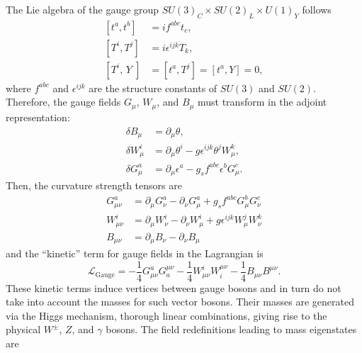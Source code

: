The Lie algebra of the gauge group $S U(3)_C \times S U(2)_{L} \times U(1)_{Y}$ follows
\begin{equation}
\begin{aligned}
	{\left[t^{a}, t^{b}\right] } &=i f^{a b c} t_{c}, \\
	{\left[T^{i}, T^{j}\right] } &=i \epsilon^{i j k} T_{k}, \\
	{\left[T^{i}, \, Y\;\right] } &=\left[t^{a}, T^{j}\right]=\left[t^{a}, Y\right]=0,
\end{aligned}
\end{equation}
where $f^{a b c}$ and $\epsilon^{i j k}$ are the structure constants of $SU(3)$ and $SU(2)$. Therefore, the gauge fields $G_\mu$, $W_\mu$, and $B_\mu$ must transform in the adjoint representation: 
\begin{equation}
	\begin{aligned}
		\delta B_{\mu} &=\partial_{\mu} \theta, \\
		\delta W_{\mu}^{i} &=\partial_{\mu} \theta^{i}-g \epsilon^{i j k} \theta^{j} W_{\mu}^{k}, \\
		\delta G_{\mu}^{a} &=\partial_{\mu} \epsilon^{a}-g_{s} f^{a b c} \epsilon^{b} G_{\mu}^{c}.
	\end{aligned}
\end{equation}
Then, the curvature strength tensors are
\begin{equation}\label{eq:field-strength-tensors}
\begin{aligned}
	G_{\mu \nu}^{a} &=\partial_{\mu} G_{\nu}^{a}-\partial_{\nu} G_{\mu}^{a}+g_{s} f^{a b c} G_{\mu}^{b} G_{\nu}^{c} \\
	W_{\mu \nu}^{i} &=\partial_{\mu} W_{\nu}^{i}-\partial_{\nu} W_{\mu}^{i}+g \epsilon^{i j k} W_{\mu}^{j} W_{\nu}^{k} \\
	B_{\mu \nu} &=\partial_{\mu} B_{\nu}-\partial_{\nu} B_{\mu}
\end{aligned}
\end{equation}
and the ``kinetic'' term for gauge fields in the Lagrangian is  
\begin{equation}\label{eq:gauge-lagrangian}
\mathcal{L}_{\text{Gauge}}=-\frac{1}{4} G_{\mu \nu}^{a} G_{a}^{\mu \nu}-\frac{1}{4} W_{\mu \nu}^{i} W_{i}^{\mu \nu}-\frac{1}{4} B_{\mu \nu} B^{\mu \nu}.
\end{equation}
These kinetic terms induce vertices between gauge bosons and in turn do not take into account the masses for such vector bosons. Their masses are generated via the Higgs mechanism, thorough linear combinations, giving rise to the physical $W^\pm$, $Z$, and $\gamma$  bosons. The field redefinitions leading to mass eigenstates are
